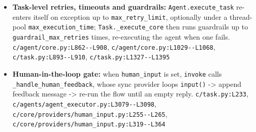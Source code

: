 \begin{itemize}
\item \textbf{Task-level retries, timeouts and guardrails:} \texttt{Agent.\allowbreak{}execute\_\allowbreak{}task} re-enters itself on exception up to \texttt{max\_\allowbreak{}retry\_\allowbreak{}limit}, optionally under a thread-pool \texttt{max\_\allowbreak{}execution\_\allowbreak{}time}; \texttt{Task.\allowbreak{}\_\allowbreak{}execute\_\allowbreak{}core} then runs guardrails up to \texttt{guardrail\_\allowbreak{}max\_\allowbreak{}retries} times, re-executing the agent when one fails. \texttt{c/\allowbreak{}agent/\allowbreak{}core.\allowbreak{}py:\allowbreak{}L862-\allowbreak{}-\allowbreak{}L908}, \texttt{c/\allowbreak{}agent/\allowbreak{}core.\allowbreak{}py:\allowbreak{}L1029-\allowbreak{}-\allowbreak{}L1068}, \texttt{c/\allowbreak{}task.\allowbreak{}py:\allowbreak{}L893-\allowbreak{}-\allowbreak{}L910}, \texttt{c/\allowbreak{}task.\allowbreak{}py:\allowbreak{}L1327-\allowbreak{}-\allowbreak{}L1395}
\item \textbf{Human-in-the-loop gate:} when \texttt{human\_\allowbreak{}input} is set, \texttt{invoke} calls \texttt{\_\allowbreak{}handle\_\allowbreak{}human\_\allowbreak{}feedback}, whose sync provider loops \texttt{input(\allowbreak{})} -> append feedback message -> re-run the flow until an empty reply. \texttt{c/\allowbreak{}task.\allowbreak{}py:\allowbreak{}L233}, \texttt{c/\allowbreak{}agents/\allowbreak{}agent\_\allowbreak{}executor.\allowbreak{}py:\allowbreak{}L3079-\allowbreak{}-\allowbreak{}L3098}, \texttt{c/\allowbreak{}core/\allowbreak{}providers/\allowbreak{}human\_\allowbreak{}input.\allowbreak{}py:\allowbreak{}L255-\allowbreak{}-\allowbreak{}L265}, \texttt{c/\allowbreak{}core/\allowbreak{}providers/\allowbreak{}human\_\allowbreak{}input.\allowbreak{}py:\allowbreak{}L319-\allowbreak{}-\allowbreak{}L364}
\end{itemize}

